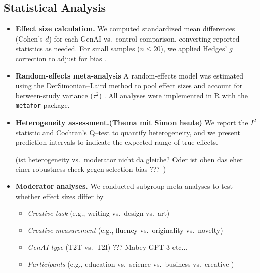 \documentclass[acmsmall,authorversion]{acmart}
\begin{document}
\subsection{Statistical Analysis}
\label{subsec:DataCollection}
\begin{itemize}
  \item \textbf{Effect size calculation.}  
    We computed standardized mean differences (Cohen’s $d$) for each GenAI vs.\ control comparison, converting reported statistics as needed. For small samples ($n \le 20$), we applied Hedges’ $g$ correction to adjust for bias \cite{Hedges1985}.

  \item \textbf{Random‐effects meta‐analysis}  
    A random-effects model was estimated using the DerSimonian–Laird method to pool effect sizes and account for between-study variance ($\tau^2$) \cite{DerSimonian1986}. All analyses were implemented in R with the \texttt{metafor} package.

  \item \textbf{Heterogeneity assessment.(Thema mit Simon heute)}  
    We report the $I^2$ statistic and Cochran’s Q–test to quantify heterogeneity, and we present prediction intervals to indicate the expected range of true effects.

    (ist heterogeneity vs. moderator nicht da gleiche? Oder ist oben das eher einer robustness check gegen selection bias ??? )

  \item \textbf{Moderator analyses.}  
    We conducted subgroup meta-analyses to test whether effect sizes differ by  
    \begin{itemize}
      \item \emph{Creative task} (e.g., writing vs.\ design vs.\ art)
      \item \emph{Creative measurement} (e.g., fluency vs.\ originality vs.\ novelty)
      \item \emph{GenAI type} (T2T vs.\ T2I)  ??? Mabey GPT-3 etc...
      \item \emph{Participants} (e.g., education vs.\ science vs.\ business vs.\ creative )
    \end{itemize}
\end{itemize}
\end{document}
